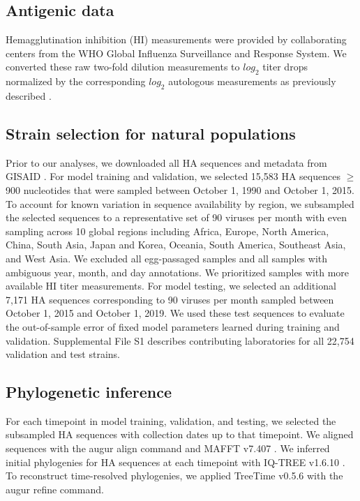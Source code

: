 \subsection*{Antigenic data}

Hemagglutination inhibition (HI) measurements were provided by collaborating centers from the WHO Global Influenza Surveillance and Response System.
We converted these raw two-fold dilution measurements to $log_{2}$ titer drops normalized by the corresponding $log_{2}$ autologous measurements as previously described \cite{Neher:2016hy}.

\subsection*{Strain selection for natural populations}

Prior to our analyses, we downloaded all HA sequences and metadata from GISAID \cite{Elbe2017}.
For model training and validation, we selected 15,583 HA sequences $\geq$900 nucleotides that were sampled between October 1, 1990 and October 1, 2015.
To account for known variation in sequence availability by region, we subsampled the selected sequences to a representative set of 90 viruses per month with even sampling across 10 global regions including Africa, Europe, North America, China, South Asia, Japan and Korea, Oceania, South America, Southeast Asia, and West Asia.
We excluded all egg-passaged samples and all samples with ambiguous year, month, and day annotations.
We prioritized samples with more available HI titer measurements.
For model testing, we selected an additional 7,171 HA sequences corresponding to 90 viruses per month sampled between October 1, 2015 and October 1, 2019.
We used these test sequences to evaluate the out-of-sample error of fixed model parameters learned during training and validation.
Supplemental File S1 describes contributing laboratories for all 22,754 validation and test strains.

\subsection*{Phylogenetic inference}

For each timepoint in model training, validation, and testing, we selected the subsampled HA sequences with collection dates up to that timepoint.
We aligned sequences with the augur align command \cite{Hadfield2018} and MAFFT v7.407 \cite{Katoh2002}.
We inferred initial phylogenies for HA sequences at each timepoint with IQ-TREE v1.6.10 \cite{Nguyen2014}.
To reconstruct time-resolved phylogenies, we applied TreeTime v0.5.6 \cite{Sagulenko2018} with the augur refine command.

